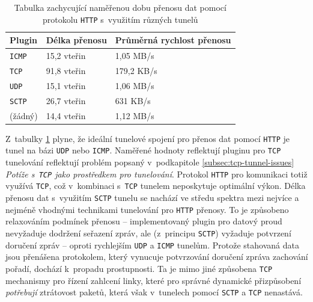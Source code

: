 \documentclass[thesis=M,czech]{FITthesis}[2012/10/20]
\begin{document}
    \begin{table}[h]
	\centering
	\begin{tabular}{|l||l|l|}
	\hline
	Plugin  & Délka přenosu & Průměrná rychlost přenosu \\ \hline \hline
	\texttt{ICMP}    & 15,2 vteřin   & 1,05 MB/s                 \\ \hline
	\texttt{TCP}     & 91,8 vteřin   & 179,2 KB/s                \\ \hline
	\texttt{UDP}     & 15,1 vteřin   & 1,06 MB/s                 \\ \hline
	\texttt{SCTP}    & 26,7 vteřin   & 631 KB/s                  \\ \hline
	(žádný) & 14,4 vteřin   & 1,12 MB/s                 \\ \hline
	\end{tabular}
	\caption{Tabulka zachycující naměřenou dobu přenosu dat pomocí protokolu \texttt{HTTP} s~využitím různých tunelů}
	\label{tab:http-download}
    \end{table}
       
       
       Z~tabulky \ref{tab:http-download} plyne, že ideální tunelové spojení pro přenos dat pomocí \texttt{HTTP} je tunel na bázi \texttt{UDP} nebo \texttt{ICMP}. Naměřené hodnoty reflektují pluginu pro \texttt{TCP} tunelování reflektují problém popsaný v~podkapitole \ref{subsec:tcp-tunnel-issues} \textit{Potíže s~\texttt{TCP} jako prostředkem pro tunelování}. Protokol \texttt{HTTP} pro komunikaci totiž využívá \texttt{TCP}, což v~kombinaci s~\texttt{TCP} tunelem neposkytuje optimální výkon. Délka přenosu dat s~využitím \texttt{SCTP} tunelu se nachází ve středu spektra mezi nejvíce a nejméně vhodnými technikami tunelování pro \texttt{HTTP} přenosy. To je způsobeno relaxováním podmínek přenosu -- implementovaný plugin pro datový proud nevyžaduje dodržení seřazení zpráv, ale (z~principu \texttt{SCTP}) vyžaduje potvrzení doručení zpráv -- oproti rychlejším \texttt{UDP} a \texttt{ICMP} tunelům. Protože stahovaná data jsou přenášena protokolem, který vynucuje potvrzování doručení zpráva zachování pořadí, dochází k~propadu prostupnosti. Ta je mimo jiné způsobena \texttt{TCP} mechanismy pro řízení zahlcení linky, které pro správné dynamické přizpůsobení \textit{potřebují} ztrátovost paketů, která však v~tunelech pomocí \texttt{SCTP} a \texttt{TCP} nenastává.
       
    
\end{document}
